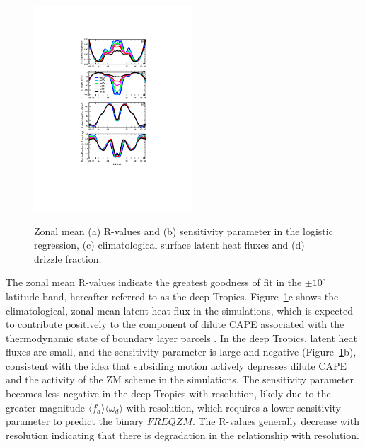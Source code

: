 \documentclass[times]{qjrms4}
\begin{document}
\begin{figure}
\begin{center}
\noindent\includegraphics[width=14pc,angle=0]{figs/temp_4zonal.pdf}\\
\end{center}
\caption{Zonal mean (a) R-values and (b) sensitivity parameter in the logistic regression, (c) climatological surface latent heat fluxes and (d) drizzle fraction.}
\label{fig:4zonal}
\end{figure}

The zonal mean R-values indicate the greatest goodness of fit in the $\pm 10^{\circ}$ latitude band, hereafter referred to as the deep Tropics. Figure~\ref{fig:4zonal}c shows the climatological, zonal-mean latent heat flux in the simulations, which is expected to contribute positively to the component of dilute CAPE associated with the thermodynamic state of boundary layer parcels \citep{Z2002JGR}. In the deep Tropics, latent heat fluxes are small, and the sensitivity parameter is large and negative (Figure~\ref{fig:4zonal}b), consistent with the idea that subsiding motion actively depresses dilute CAPE and the activity of the ZM scheme in the simulations. The sensitivity parameter becomes less negative in the deep Tropics with resolution, likely due to the greater magnitude $\langle f_{d} \rangle \langle \omega_{d} \rangle$ with resolution, which requires a lower sensitivity parameter to predict the binary $FREQZM$. The R-values generally decrease with resolution indicating that there is degradation in the relationship with resolution.
\end{document}
